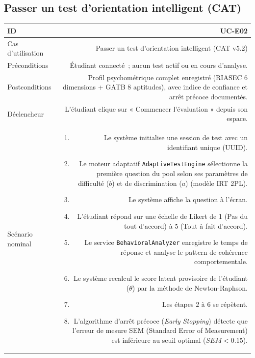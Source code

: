 \vspace{1.5em}

\subsection{Passer un test d'orientation intelligent (CAT)}

\noindent
{}
\begin{tabularx}{\linewidth}{|L|R|}
\hline
{}ID & UC-E02 \\
\hline
Cas d'utilisation & Passer un test d'orientation intelligent (CAT v5.2) \\
\hline
{}Préconditions & Étudiant connecté~; aucun test actif ou en cours d'analyse. \\
\hline
Postconditions & Profil psychométrique complet enregistré (RIASEC 6 dimensions + GATB 8 aptitudes), avec indice de confiance et arrêt précoce documentés. \\
\hline
{}Déclencheur & L'étudiant clique sur « Commencer l'évaluation » depuis son espace. \\
\hline
Scénario nominal &
\begin{enumerate}[nosep,leftmargin=*]
  \item Le système initialise une session de test avec un identifiant unique (UUID).
  \item Le moteur adaptatif \texttt{AdaptiveTestEngine} sélectionne la première question du pool selon ses paramètres de difficulté ($b$) et de discrimination ($a$) (modèle IRT 2PL).
  \item Le système affiche la question à l'écran.
  \item L'étudiant répond sur une échelle de Likert de 1 (Pas du tout d'accord) à 5 (Tout à fait d'accord).
  \item Le service \texttt{BehavioralAnalyzer} enregistre le temps de réponse et analyse le pattern de cohérence comportementale.
  \item Le système recalcul le score latent provisoire de l'étudiant ($\theta$) par la méthode de Newton-Raphson.
  \item Les étapes 2 à 6 se répètent.
  \item L'algorithme d'arrêt précoce (\textit{Early Stopping}) détecte que l'erreur de mesure SEM (Standard Error of Measurement) est inférieure au seuil optimal ($SEM < 0.15$).

\end{enumerate}
\end{tabularx}
